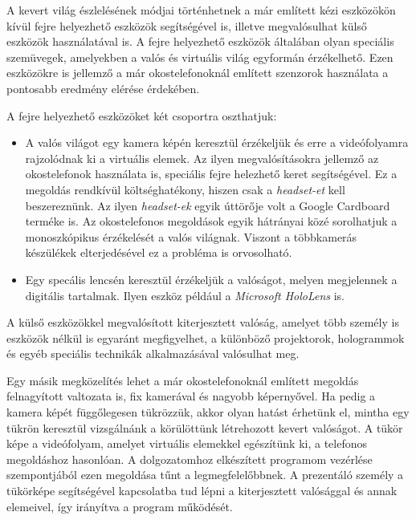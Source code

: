 A kevert világ észlelésének módjai történhetnek a már említett kézi eszközökön kívül fejre helyezhető eszközök segítségével is, illetve megvalósulhat külső eszközök használatával is.
A fejre helyezhető eszközök általában olyan speciális szemüvegek, amelyekben a valós és virtuális világ egyformán érzékelhető. Ezen eszközökre is jellemző a már okostelefonoknál említett szenzorok használata a pontosabb eredmény elérése érdekében.

A fejre helyezhető eszközöket két csoportra oszthatjuk:
\begin{itemize}
	\item A valós világot egy kamera képén keresztül érzékeljük és erre a videófolyamra rajzolódnak ki a virtuális elemek. Az ilyen megvalósításokra jellemző az okostelefonok használata is, speciális fejre helezhető keret segítségével. Ez a megoldás rendkívül költséghatékony, hiszen csak a \textit{headset-et} kell beszereznünk. Az ilyen \textit{headset-ek} egyik úttörője volt a Google Cardboard terméke is. Az okostelefonos megoldások egyik hátrányai közé sorolhatjuk a monoszkópikus érzékelését a valós világnak. Viszont a többkamerás készülékek elterjedésével ez a probléma is orvosolható.
	
	\item Egy specális lencsén keresztül érzékeljük a valóságot, melyen megjelennek a digitális tartalmak. Ilyen eszköz például a \textit{Microsoft HoloLens} is.
\end{itemize}

A külső eszközökkel megvalósított kiterjesztett valóság, amelyet több személy is eszközök nélkül is egyaránt megfigyelhet, a különböző projektorok, hologrammok és egyéb speciális technikák alkalmazásával valósulhat meg.

Egy másik megközelítés lehet a már okostelefonoknál említett megoldás felnagyított valtozata is, fix kamerával és nagyobb képernyővel. Ha pedig a kamera képét függőlegesen tükrözzük, akkor olyan hatást érhetünk el, mintha egy tükrön keresztül vizsgálnánk a körülöttünk létrehozott kevert valóságot. A tükör képe a videófolyam, amelyet virtuális elemekkel egészítünk ki, a telefonos megoldáshoz hasonlóan.
A dolgozatomhoz elkészített programom vezérlése szempontjából ezen megoldása tűnt a legmegfelelőbbnek. A prezentáló személy a tükörképe segítségével kapcsolatba tud lépni a kiterjesztett valósággal és annak elemeivel, így irányítva a program működését.



